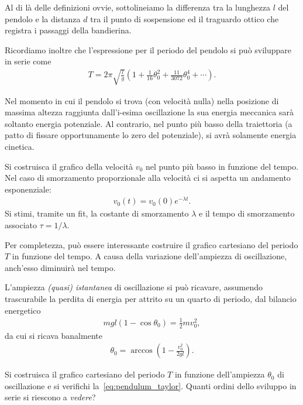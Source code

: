 \documentclass{lab1-article}
\begin{document}
\begin{article}
Al di l\`a delle definizioni ovvie, sottolineiamo la differenza tra la lunghezza
$l$ del pendolo e la distanza $d$ tra il punto di sospensione ed il traguardo
ottico che registra i passaggi della bandierina.

Ricordiamo inoltre che l'espressione per il periodo del pendolo si pu\`o
sviluppare in serie come
\begin{align}\label{eq:pendulum_taylor}
T = 2\pi\sqrt{\frac{l}{g}} \left( 1 + \frac{1}{16}\theta_0^2 +
\frac{11}{3072}\theta_0^4 + \cdots \right).
\end{align}


\secmeasurements

Nel momento in cui il pendolo si trova (con velocit\`a nulla) nella posizione
di massima altezza raggiunta dall'\mbox{i-esima} oscillazione la sua energia meccanica
sar\`a soltanto energia potenziale. Al contrario, nel punto pi\`u basso della
traiettoria (a patto di fissare opportunamente lo zero del potenziale), si
avr\`a solamente energia cinetica.



Si costruisca il grafico della velocit\`a $v_0$ nel punto pi\`u basso in
funzione del tempo. Nel caso di smorzamento proporzionale alla velocit\`a
ci si aspetta un andamento esponenziale:
\begin{align}
  v_0(t) = v_0(0) e^{-\lambda t}.
\end{align}
Si stimi, tramite un fit, la costante di smorzamento
$\lambda$ e il tempo di smorzamento associato $\tau = 1/\lambda$.

Per completezza, pu\`o essere interessante costruire il grafico cartesiano
del periodo $T$ in funzione del tempo. A causa della variazione dell'ampiezza
di oscillazione, anch'esso diminuir\`a nel tempo.



L'ampiezza \emph{(quasi) istantanea} di oscillazione si pu\`o ricavare,
assumendo trascurabile la perdita di energia per attrito su un quarto di periodo, dal
bilancio energetico
\begin{align}
  mgl(1 - \cos\theta_0) = \frac{1}{2}mv_0^2,
\end{align}
da cui si ricava banalmente
\begin{align}
  \theta_0 = \arccos\left( 1 - \frac{v_0^2}{2gl} \right).
\end{align}

Si costruisca il grafico cartesiano del periodo $T$ in funzione
dell'ampiezza $\theta_0$ di oscillazione  e si verifichi
la~\eqref{eq:pendulum_taylor}.
Quanti ordini dello sviluppo in serie si riescono a \emph{vedere}?



\end{article}
\end{document}
